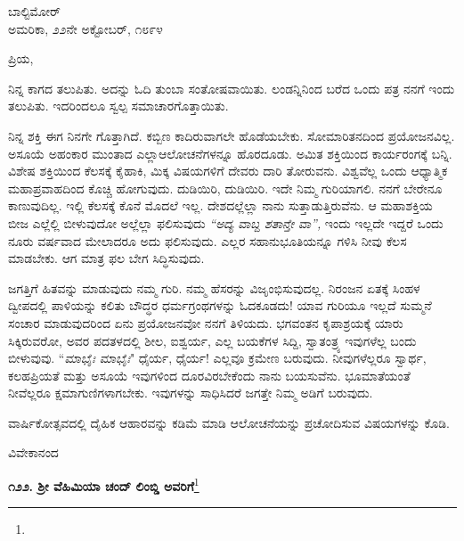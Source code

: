 \vspace{-0.5cm}

\begin{flushright}
ಬಾಲ್ಟಿಮೋರ್\\ಅಮರಿಕಾ, ೨೨ನೇ ಅಕ್ಟೋಬರ್, ೧೮೯೪
\end{flushright}

\vspace{-0.5cm}

\noindent
ಪ್ರಿಯ,

ನಿನ್ನ ಕಾಗದ ತಲುಪಿತು. ಅದನ್ನು ಓದಿ ತುಂಬಾ ಸಂತೋಷವಾಯಿತು. ಲಂಡನ್ನಿನಿಂದ ಬರೆದ ಒಂದು ಪತ್ರ ನನಗೆ ಇಂದು ತಲುಪಿತು. ಇದರಿಂದಲೂ ಸ್ವಲ್ಪ ಸಮಾಚಾರ\break ಗೊತ್ತಾಯಿತು.

ನಿನ್ನ ಶಕ್ತಿ ಈಗ ನಿನಗೇ ಗೊತ್ತಾಗಿದೆ. ಕಬ್ಬಿಣ ಕಾದಿರುವಾಗಲೇ ಹೊಡೆಯಬೇಕು. ಸೋಮಾರಿತನದಿಂದ ಪ್ರಯೋಜನವಿಲ್ಲ. ಅಸೂಯೆ ಅಹಂಕಾರ ಮುಂತಾದ ಎಲ್ಲಾ\break ಆಲೋಚನೆಗಳನ್ನೂ ಹೊರದೂಡು. ಅಮಿತ ಶಕ್ತಿಯಿಂದ ಕಾರ್ಯರಂಗಕ್ಕೆ ಬನ್ನಿ. ವಿಶೇಷ ಶಕ್ತಿಯಿಂದ ಕೆಲಸಕ್ಕೆ ಕೈಹಾಕಿ, ಮಿಕ್ಕ ವಿಷಯಗಳಿಗೆ ದೇವರು ದಾರಿ ತೋರುವನು. ವಿಶ್ವವೆಲ್ಲ ಒಂದು ಆಧ್ಯಾತ್ಮಿಕ ಮಹಾಪ್ರವಾಹದಿಂದ ಕೊಚ್ಚಿ ಹೋಗುವುದು. ದುಡಿಯಿರಿ, ದುಡಿಯಿರಿ. ಇದೇ ನಿಮ್ಮ ಗುರಿಯಾಗಲಿ. ನನಗೆ ಬೇರೇನೂ ಕಾಣುವುದಿಲ್ಲ. ಇಲ್ಲಿ ಕೆಲಸಕ್ಕೆ ಕೊನೆ ಮೊದಲೆ ಇಲ್ಲ. ದೇಶದಲ್ಲೆಲ್ಲಾ ನಾನು ಸುತ್ತಾಡುತ್ತಿರುವೆನು. ಆ ಮಹಾಶಕ್ತಿಯ ಬೀಜ ಎಲ್ಲೆಲ್ಲಿ ಬೀಳುವುದೋ ಅಲ್ಲೆಲ್ಲಾ ಫಲಿಸುವುದು\enginline{-} \textit{``ಅದ್ಯ ವಾಬ್ದ ಶತಾನ್ತೇ ವಾ”, } ಇಂದು ಇಲ್ಲದೇ ಇದ್ದರೆ ಒಂದು ನೂರು ವರ್ಷವಾದ ಮೇಲಾದರೂ ಅದು ಫಲಿಸುವುದು. ಎಲ್ಲರ ಸಹಾನುಭೂತಿಯನ್ನೂ ಗಳಿಸಿ ನೀವು ಕೆಲಸ ಮಾಡಬೇಕು. ಆಗ ಮಾತ್ರ ಫಲ ಬೇಗ ಸಿದ್ಧಿಸುವುದು.

ಜಗತ್ತಿಗೆ ಹಿತವನ್ನು ಮಾಡುವುದು ನಮ್ಮ ಗುರಿ. ನಮ್ಮ ಹೆಸರನ್ನು ವಿಜೃಂಭಿಸುವುದಲ್ಲ. ನಿರಂಜನ ಏತಕ್ಕೆ ಸಿಂಹಳ ದ್ವೀಪದಲ್ಲಿ ಪಾಳಿಯನ್ನು ಕಲಿತು ಬೌದ್ಧರ ಧರ್ಮಗ್ರಂಥಗಳನ್ನು ಓದಕೂಡದು! ಯಾವ ಗುರಿಯೂ ಇಲ್ಲದೆ ಸುಮ್ಮನೆ ಸಂಚಾರ ಮಾಡುವುದರಿಂದ ಏನು ಪ್ರಯೋಜನವೋ ನನಗೆ ತಿಳಿಯದು. ಭಗವಂತನ ಕೃಪಾಶ್ರಯಕ್ಕೆ ಯಾರು ಸಿಕ್ಕಿರುವರೋ, ಅವರ ಪದತಳದಲ್ಲಿ ಶೀಲ, ಐಶ್ವರ್ಯ, ಎಲ್ಲ ಬಯಕೆಗಳ ಸಿದ್ದಿ, ಸ್ವಾತಂತ್ರ್ಯ ಇವುಗಳೆಲ್ಲ ಬಂದು ಬೀಳುವುವು. ``\textit{ಮಾಭೈಃ ಮಾಭೈಃ}" ಧೈರ್ಯ, ಧೈರ್ಯ! ಎಲ್ಲವೂ ಕ್ರಮೇಣ ಬರುವುದು. ನೀವುಗಳೆಲ್ಲರೂ ಸ್ವಾರ್ಥ, ಕಲಹಪ್ರಿಯತೆ ಮತ್ತು ಅಸೂಯೆ ಇವುಗಳಿಂದ ದೂರ\break ವಿರಬೇಕೆಂದು ನಾನು ಬಯಸುವೆನು. ಭೂಮಾತೆಯಂತೆ ನೀವೆಲ್ಲರೂ ಕ್ಷಮಾಗುಣಿಗಳಾಗಬೇಕು. ಇವುಗಳನ್ನು ಸಾಧಿಸಿದರೆ ಜಗತ್ತೇ ನಿಮ್ಮ ಅಡಿಗೆ ಬರುವುದು.

ವಾರ್ಷಿಕೋತ್ಸವದಲ್ಲಿ ದೈಹಿಕ ಆಹಾರವನ್ನು ಕಡಿಮೆ ಮಾಡಿ ಆಲೋಚನೆಯನ್ನು ಪ್ರಚೋದಿಸುವ ವಿಷಯಗಳನ್ನು ಕೊಡಿ.

\vspace{-0.5cm}

{\flushright
ವಿವೇಕಾನಂದ\par}

\begin{center}
\textbf{೧೨೨. ಶ‍್ರೀ ವೆಹಿಮಿಯಾ ಚಂದ್ ಲಿಂಬ್ಡಿ ಅವರಿಗೆ}\footnote{}
\end{center}

\vspace{-0.5cm}

